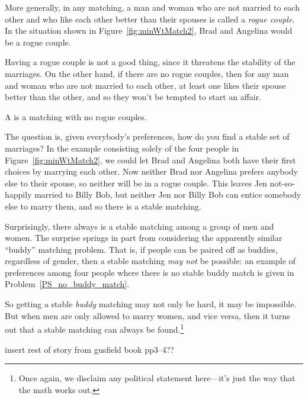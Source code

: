 More generally, in any matching, a man and woman who are not married
to each other and who like each other better than their spouses is
called a \emph{rogue couple}.  In the situation shown in
Figure~\ref{fig:minWtMatch2}, Brad and Angelina would be a rogue
couple.

Having a rogue couple is not a good thing, since it threatens the
stability of the marriages.  On the other hand, if there are no rogue
couples, then for any man and woman who are not married to each other,
at least one likes their spouse better than the other, and so they
won't be tempted to start an affair.

\begin{definition}
  A  is a matching with no rogue couples.
\end{definition}

The question is, given everybody's preferences, how do you find a
stable set of marriages?  In the example consisting solely of the four
people in Figure~\ref{fig:minWtMatch2}, we could let Brad and Angelina
both have their first choices by marrying each other.  Now neither
Brad nor Angelina prefers anybody else to their spouse, so neither
will be in a rogue couple.  This leaves Jen not-so-happily married to
Billy Bob, but neither Jen nor Billy Bob can entice somebody else to
marry them, and so there is a stable matching.

Surprisingly, there always is a stable matching among a group of men
and women.  The surprise springs in part from considering the
apparently similar ``buddy'' matching problem.  That is, if people can
be paired off as buddies, regardless of gender, then a stable matching
\emph{may not} be possible: an example of preferences among four
people where there is no stable buddy match is given in
Problem~\ref{PS_no_buddy_match}.

So getting a stable \emph{buddy} matching may not only be hard, it may
be impossible.  But when men are only allowed to marry women, and vice
versa, then it turns out that a stable matching can always be
found.\footnote{Once again, we disclaim any political statement
here---it's just the way that the math works out.}

\begin{editingnotes}
insert rest of story from gusfield book pp3--4??
\end{editingnotes}

